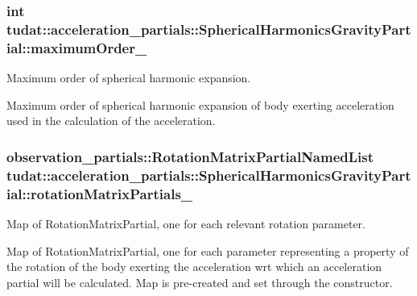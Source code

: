 \subsubsection[{\texorpdfstring{maximum\+Order\+\_\+}{maximumOrder_}}]{\setlength{\rightskip}{0pt plus 5cm}int tudat\+::acceleration\+\_\+partials\+::\+Spherical\+Harmonics\+Gravity\+Partial\+::maximum\+Order\+\_\+\hspace{0.3cm}{\ttfamily [protected]}}\hypertarget{classtudat_1_1acceleration__partials_1_1SphericalHarmonicsGravityPartial_a6d7ad24c3d1f2c8faaa861206872c822}{}\label{classtudat_1_1acceleration__partials_1_1SphericalHarmonicsGravityPartial_a6d7ad24c3d1f2c8faaa861206872c822}


Maximum order of spherical harmonic expansion. 

Maximum order of spherical harmonic expansion of body exerting acceleration used in the calculation of the acceleration. 
\subsubsection[{\texorpdfstring{rotation\+Matrix\+Partials\+\_\+}{rotationMatrixPartials_}}]{\setlength{\rightskip}{0pt plus 5cm}observation\+\_\+partials\+::\+Rotation\+Matrix\+Partial\+Named\+List tudat\+::acceleration\+\_\+partials\+::\+Spherical\+Harmonics\+Gravity\+Partial\+::rotation\+Matrix\+Partials\+\_\+\hspace{0.3cm}{\ttfamily [protected]}}\hypertarget{classtudat_1_1acceleration__partials_1_1SphericalHarmonicsGravityPartial_a66bd0af703babbf495b82ff1dfa88757}{}\label{classtudat_1_1acceleration__partials_1_1SphericalHarmonicsGravityPartial_a66bd0af703babbf495b82ff1dfa88757}


Map of Rotation\+Matrix\+Partial, one for each relevant rotation parameter. 

Map of Rotation\+Matrix\+Partial, one for each parameter representing a property of the rotation of the body exerting the acceleration wrt which an acceleration partial will be calculated. Map is pre-\/created and set through the constructor. 
